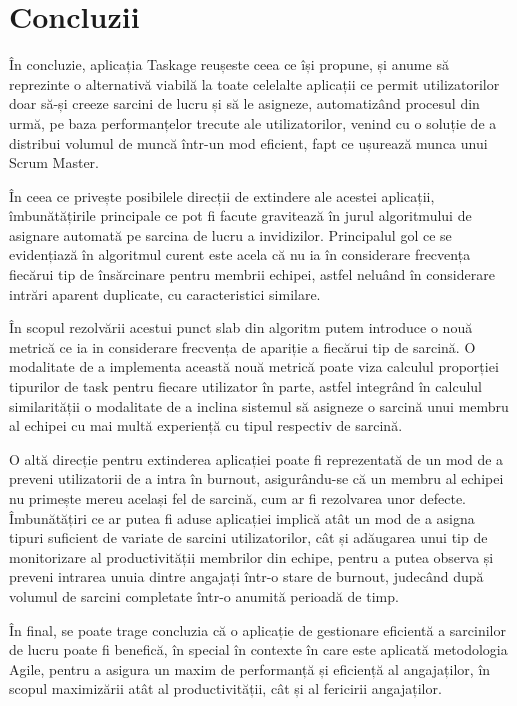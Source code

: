 \chapter{Concluzii}

În concluzie, aplicația Taskage reușeste ceea ce își propune, și anume să reprezinte o alternativă viabilă la toate celelalte aplicații ce permit utilizatorilor doar să-și creeze sarcini de lucru și să le asigneze, automatizând procesul din urmă, pe baza performanțelor trecute ale utilizatorilor, venind cu o soluție de a distribui volumul de muncă într-un mod eficient, fapt ce ușurează munca unui Scrum Master.

În ceea ce privește posibilele direcții de extindere ale acestei aplicații, îmbunătățirile principale ce pot fi facute gravitează în jurul algoritmului de asignare automată pe sarcina de lucru a invidizilor. Principalul gol ce se evidențiază în algoritmul curent este acela că nu ia în considerare frecvența fiecărui tip de însărcinare pentru membrii echipei, astfel neluând în considerare intrări aparent duplicate, cu caracteristici similare. 

În scopul rezolvării acestui punct slab din algoritm putem introduce o nouă metrică ce ia in considerare frecvența de apariție a fiecărui tip de sarcină. O modalitate de a implementa această nouă metrică poate viza calculul proporției tipurilor de task pentru fiecare utilizator în parte, astfel integrând în calculul similarității o modalitate de a inclina sistemul să asigneze o sarcină unui membru al echipei cu mai multă experiență cu tipul respectiv de sarcină.

O altă direcție pentru extinderea aplicației poate fi reprezentată de un mod de a preveni utilizatorii de a intra în burnout, asigurându-se că un membru al echipei nu primește mereu același fel de sarcină, cum ar fi rezolvarea unor defecte. Îmbunătățiri ce ar putea fi aduse aplicației implică atât un mod de a asigna tipuri suficient de variate de sarcini utilizatorilor, cât și adăugarea unui tip de monitorizare al productivității membrilor din echipe, pentru a putea observa și preveni intrarea unuia dintre angajați într-o stare de burnout, judecând după volumul de sarcini completate într-o anumită perioadă de timp.

În final, se poate trage concluzia că o aplicație de gestionare eficientă a sarcinilor de lucru poate fi benefică, în special în contexte în care este aplicată metodologia Agile, pentru a asigura un maxim de performanță și eficiență al angajaților, în scopul maximizării atât al productivității, cât și al fericirii angajaților.